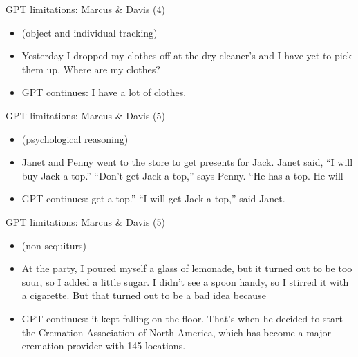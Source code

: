\begin{vbframe}{GPT limitations: Marcus \& Davis (4)}

\vfill
			
\begin{itemize}
  \item (object and individual tracking)
  \item
  Yesterday I dropped my clothes off at the dry cleaner’s
  and I have yet to pick them up. Where are my clothes?

  \item
  GPT continues:
 I
  have a lot of clothes.

\end{itemize}

\vfill

\end{vbframe}


\begin{vbframe}{GPT limitations: Marcus \& Davis (5)}

\vfill

\begin{itemize}
  \item (psychological reasoning)
  \item
Janet and Penny went to the store to get presents for
Jack. Janet said, “I will buy Jack a top.” “Don’t get Jack a
top,” says Penny. “He has a top. He will
  \item
  GPT continues:
 get a top.” “I will
get Jack a top,” said Janet.


\end{itemize}

\vfill

\end{vbframe}


\begin{vbframe}{GPT limitations: Marcus \& Davis (5)}

\vfill

\begin{itemize}
  \item (non sequiturs)
  \item
At the party, I poured myself a glass of lemonade, but it
turned out to be too sour, so I added a little sugar. I
didn’t see a spoon handy, so I stirred it with a
cigarette. But that turned out to be a bad idea because

  \item
  GPT continues:
 it
kept falling on the floor. That’s when he decided to start
the Cremation Association of North America, which has become
a major cremation provider with 145 locations.


\end{itemize}

\vfill

\end{vbframe}


\endlecture

